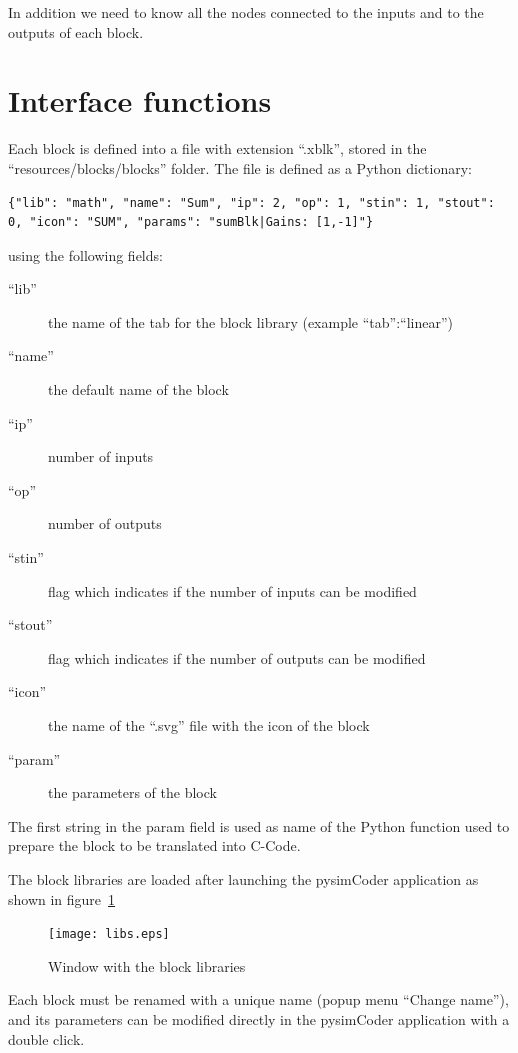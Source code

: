 In addition we need to know all the nodes connected to the inputs and to the 
outputs of each block.

\section{Interface functions}

Each block is defined into a file with extension ``.xblk'', stored in 
the ``resources/blocks/blocks'' folder.
The file is defined as a Python dictionary:

\scriptsize
\begin{verbatim}
{"lib": "math", "name": "Sum", "ip": 2, "op": 1, "stin": 1, "stout": 0, "icon": "SUM", "params": "sumBlk|Gains: [1,-1]"}
\end{verbatim}
\normalsize

using the following fields:

\begin{description}
\item[``lib''] the name of the tab for the block library (example 
``tab'':``linear'')
\item [``name''] the default name of the block
\item [``ip''] number of inputs
\item [``op''] number of outputs
\item [``stin''] flag which indicates if the number of inputs can be modified
\item [``stout''] flag which indicates if the number of outputs can be modified
\item [``icon'']the name of the ``.svg'' file with the icon of the block
\item [``param''] the parameters of the block
\end{description}

The first string in the param field is used as name of the Python function used 
to prepare the block to be translated into C-Code.

The block libraries are loaded after launching the pysimCoder application as shown 
in figure~\ref{Fig:app1}

 \begin{figure}[htbp]	%
 \centering
 \texttt{[image: libs.eps]}
 \caption{Window with the block libraries}
 \label{Fig:app1}
 \end{figure}

Each block must be renamed with a unique name (popup menu ``Change name''), and 
its parameters can be modified directly in the pysimCoder application with a double 
click.

